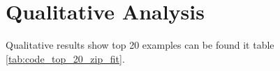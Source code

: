 

\section{Qualitative Analysis}
Qualitative results show top 20 examples can be found it table \ref{tab:code_top_20_zip_fit}.

